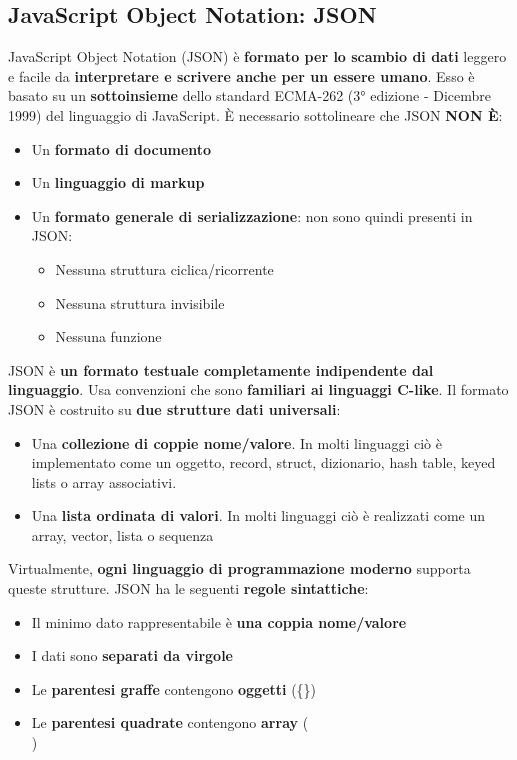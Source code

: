 \documentclass[12pt]{article}
\begin{document}
\subsection{JavaScript Object Notation: JSON}
JavaScript Object Notation (JSON) è \textbf{formato per lo scambio di dati} leggero e facile da \textbf{interpretare e scrivere anche per un essere umano}.
Esso è basato su un \textbf{sottoinsieme} dello standard ECMA-262 (3° edizione - Dicembre 1999) del linguaggio di JavaScript.
È necessario sottolineare che JSON \textbf{NON È}:
\begin{itemize}
    \item Un \textbf{formato di documento}
    \item Un \textbf{linguaggio di markup}
    \item Un \textbf{formato generale di serializzazione}: non sono quindi presenti in JSON:
    \begin{itemize}
        \item Nessuna struttura ciclica/ricorrente
        \item Nessuna struttura invisibile
        \item Nessuna funzione
    \end{itemize}
\end{itemize}
JSON è \textbf{un formato testuale completamente indipendente dal linguaggio}. Usa convenzioni che sono \textbf{familiari ai linguaggi C-like}.
Il formato JSON è costruito su \textbf{due strutture dati universali}:
\begin{itemize}
    \item Una \textbf{collezione di coppie nome/valore}. In molti linguaggi ciò è implementato come un oggetto, record, struct, dizionario, hash table, keyed lists o array associativi.
    \item Una \textbf{lista ordinata di valori}. In molti linguaggi ciò è realizzati come un array, vector, lista o sequenza
\end{itemize}
Virtualmente, \textbf{ogni linguaggio di programmazione moderno} supporta queste strutture. \newline
JSON ha le seguenti \textbf{regole sintattiche}:
\begin{itemize}
    \item Il minimo dato rappresentabile è \textbf{una coppia nome/valore}
    \item I dati sono \textbf{separati da virgole}
    \item Le \textbf{parentesi graffe} contengono \textbf{oggetti} (\{\})
    \item Le \textbf{parentesi quadrate} contengono \textbf{array} (\[\])
\end{itemize}
\end{document}
